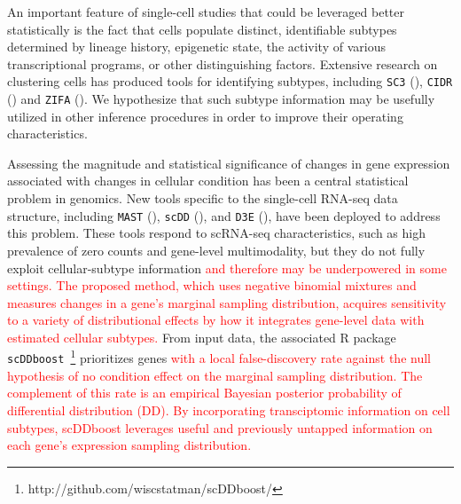 \documentclass[aoas,preprint]{imsart}
\begin{document}
An important feature of single-cell studies that could be leveraged better
statistically is the fact that cells populate distinct, identifiable subtypes
determined by lineage history, epigenetic state, the activity
of various transcriptional programs, or other 
distinguishing factors. Extensive research on clustering cells
has produced tools for identifying subtypes, including 
 \verb+SC3+ (\cite{sc3}), \verb+CIDR+ (\cite{CIDR}) and \verb+ZIFA+ (\cite{ZIFA}).
We hypothesize that such
subtype information may be usefully utilized in other inference procedures in order
to improve their operating characteristics. 

Assessing the magnitude and statistical significance of changes in gene
expression associated with changes in cellular condition has been a central
statistical problem in genomics. New tools specific to
the single-cell RNA-seq data structure, including \verb+MAST+
(\cite{ref:MAST}), \verb+scDD+ (\cite{ref:scDD}), and \verb+D3E+ (\cite{ref:d3e}),
have been deployed to address this problem.
These tools respond
to scRNA-seq characteristics, such as high prevalence of zero counts and
gene-level multimodality, but they do not fully exploit cellular-subtype
information \textcolor{red}{and therefore may be underpowered in some settings.  The proposed method,
which uses negative binomial mixtures and measures changes in a gene's marginal sampling distribution, 
acquires sensitivity to a variety of distributional effects by how it integrates 
gene-level data with estimated cellular subtypes.}
From input data, the associated R package 
\verb+scDDboost+~\footnote{http://github.com/wiscstatman/scDDboost/}
prioritizes genes \textcolor{red}{with a local false-discovery rate against the 
null hypothesis of no condition effect on the marginal sampling distribution.  The complement
of this rate is an empirical Bayesian posterior probability of differential distribution (DD). 
By incorporating transciptomic information on cell subtypes, scDDboost leverages
useful and previously untapped information on each gene's expression sampling distribution.}

\end{document}
